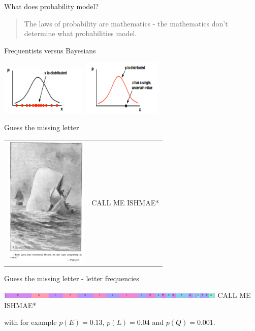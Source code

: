 \documentclass{beamer}
\newcommand{\crish}{\color{reddish}}
\newcommand{\cbla}{\color{black}}
\newcommand{\cred}{\color{red}}
\newcommand{\cblu}{\color{blue}}
\begin{document}
\begin{frame}{What does probability model?}
  \begin{quote}
    The laws of probability are mathematics - the mathematics don't determine what probabilities model.
    \end{quote}
\end{frame}

\begin{frame}{Frequentists versus Bayesians}
  \begin{center}
\includegraphics[width=4.125cm]{fig_freq.png}
\includegraphics[width=3.75cm]{fig_bayes.png}
\end{center}
  \vfill
{}  
\end{frame}

\begin{frame}{Guess the missing letter}
  \begin{tabular}{lc}
    \includegraphics[width=4cm]{Moby_Dick.jpg}&\cred{}CALL ME ISHMAE*\cbla{}
  \end{tabular}
  \end{frame}


\begin{frame}{Guess the missing letter - letter frequencies}
  \begin{center}
    \includegraphics[width=11cm]{freq.png}
  \vskip 1cm
    \cred{}CALL ME ISHMAE\cblu{}*\cbla{}
  \end{center}
  with for example \crish$p(E)=0.13$\cbla{}, \crish$p(L)=0.04$\cbla{} and \crish$p(Q)=0.001$\cbla{}. 
  \vfill
  \end{frame}
\end{document}
